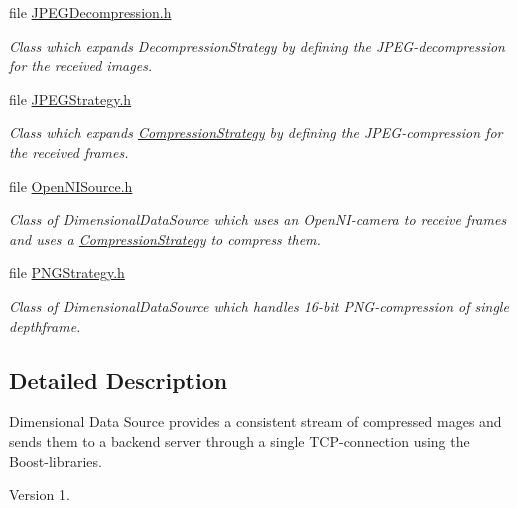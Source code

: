 \begin{DoxyCompactItemize}
file \hyperlink{_j_p_e_g_decompression_8h}{J\+P\+E\+G\+Decompression.\+h}
\begin{DoxyCompactList}\small\item\em Class which expands Decompression\+Strategy by defining the J\+P\+E\+G-\/decompression for the received images. \end{DoxyCompactList}\item 
file \hyperlink{_j_p_e_g_strategy_8h}{J\+P\+E\+G\+Strategy.\+h}
\begin{DoxyCompactList}\small\item\em Class which expands \hyperlink{class_compression_strategy}{Compression\+Strategy} by defining the J\+P\+E\+G-\/compression for the received frames. \end{DoxyCompactList}\item 
file \hyperlink{_open_n_i_source_8h}{Open\+N\+I\+Source.\+h}
\begin{DoxyCompactList}\small\item\em Class of Dimensional\+Data\+Source which uses an Open\+N\+I-\/camera to receive frames and uses a \hyperlink{class_compression_strategy}{Compression\+Strategy} to compress them. \end{DoxyCompactList}\item 
file \hyperlink{_p_n_g_strategy_8h}{P\+N\+G\+Strategy.\+h}
\begin{DoxyCompactList}\small\item\em Class of Dimensional\+Data\+Source which handles 16-\/bit P\+N\+G-\/compression of single depthframe. \end{DoxyCompactList}\end{DoxyCompactItemize}


\subsection{Detailed Description}
Dimensional Data Source provides a consistent stream of compressed mages and sends them to a backend server through a single T\+C\+P-\/connection using the Boost-\/libraries. 

\begin{DoxyVersion}{Version}
1. 
\end{DoxyVersion}
